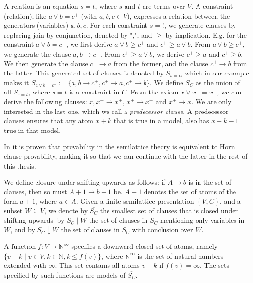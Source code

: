 A relation is an equation $s = t$, where $s$ and $t$ are terms over $V$.
A constraint (relation), like $a \lor b = c^+$ (with $a, b, c \in V$), expresses a relation between the generators (variables) $a, b, c$.
For each constraint $s = t$, we generate clauses by replacing join by conjunction, denoted by ",", and $\geq$ by implication.
E.g. for the constraint $a \lor b = c^+$, we first derive $a \lor b \geq c^+$ and $c^+ \geq a \lor b$.
From $a \lor b \geq c^+$, we generate the clause $a, b \rightarrow c^+$.
From $c^+ \geq a \lor b$, we derive $c^+ \geq a$ and $c^+ \geq b$.
We then generate the clause $c^+ \rightarrow a$ from the former, and the clause $c^+ \rightarrow b$ from the latter.
This generated set of clauses is denoted by $S_{s=t}$, which in our example makes it
$S_{a \lor b = c^+} := \{a, b \rightarrow c^+, c^+ \rightarrow a, c^+ \rightarrow b\}$.
We define $S_C$ as the union of all $S_{s=t}$, where $s = t$ is a constraint in $C$.
From the axiom $x \lor x^+ = x^+$, we can derive the following clauses:
$x, x^+ \rightarrow x^+$,
$x^+ \rightarrow x^+$ and $x^+ \rightarrow x$.
We are only interested in the last one, which we call a \emph{predecessor clause}.
A predecessor clauses ensures that any atom $x + k$ that is true in a model,
also has $x + k - 1$ true in that model.


In \cite[Theorem 2.2,~p.~3]{mbezem} it is proven that provability in the semilattice theory
is equivalent to Horn clause provability, making it so that we can continue with the latter in the rest of this thesis.

We define closure under shifting upwards as follows:
if $A \rightarrow b$ is in the set of clauses, then so must $A + 1 \rightarrow b + 1$ be.
$A + 1$ denotes the set of atoms of the form $a + 1$, where $a \in A$.
Given a finite semilattice presentation $(V, C)$,
and a subset $W \subseteq V$, we denote by
$\overline{S_C}$ the smallest set of clauses that is closed under shifting upwards,
by $\overline{S_C} \mid W$ the set of clauses in $\overline{S_C}$
mentioning only variables in $W$, and by $\overline{S_C} \downarrow W$
the set of clauses in $\overline{S_C}$ with conclusion over $W$.

A function $f : V \rightarrow \mathbb{N}^{\infty}$ specifies a downward closed set of atoms,
namely $\{v + k \mid v \in V, k \in \mathbb{N}, k \le f(v)\}$,
where $\mathbb{N}^{\infty}$ is the set of natural numbers extended with $\infty$.
This set contains all atoms $v + k$ if $f(v) = \infty$.
The sets specified by such functions are models of $\overline{S_C}$.

